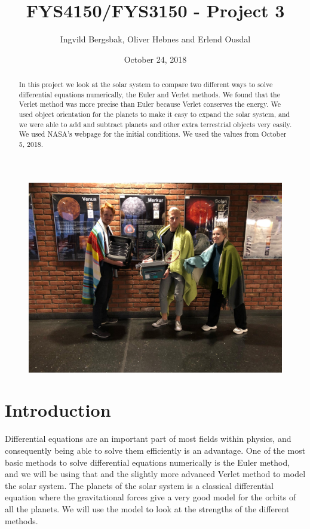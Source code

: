 \documentclass{article}
\begin{document}
\title{\textbf{FYS4150/FYS3150 - Project 3}}
\author{Ingvild Bergsbak, Oliver Hebnes and Erlend Ousdal}
\date{October 24, 2018}




\maketitle
\begin{figure}[H]
  \includegraphics[scale=0.15]{plots/group_pic.jpg}
  \label{}
  \centering
\end{figure}


\newpage

\begin{abstract}
In this project we look at the solar system to compare two different ways to solve differential equations numerically, the Euler and Verlet methods. We found that the Verlet method was more precise than Euler because Verlet conserves the energy. We used object orientation for the planets to make it easy to expand the solar system, and we were able to add and subtract planets and other extra terrestrial objects very easily. We used NASA's webpage \cite{NASA} for the initial conditions. We used the values from October 5, 2018.
\end{abstract}


\section{Introduction}
Differential equations are an important part of most fields within physics, and consequently being able to solve them efficiently is an advantage. One of the most basic methods to solve differential equations numerically is the Euler method, and we will be using that and the slightly more advanced Verlet method to model the solar system. The planets of the solar system is a classical differential equation where the gravitational forces give a very good model for the orbits of all the planets. We will use the model to look at the strengths of the different methods.
\end{document}
